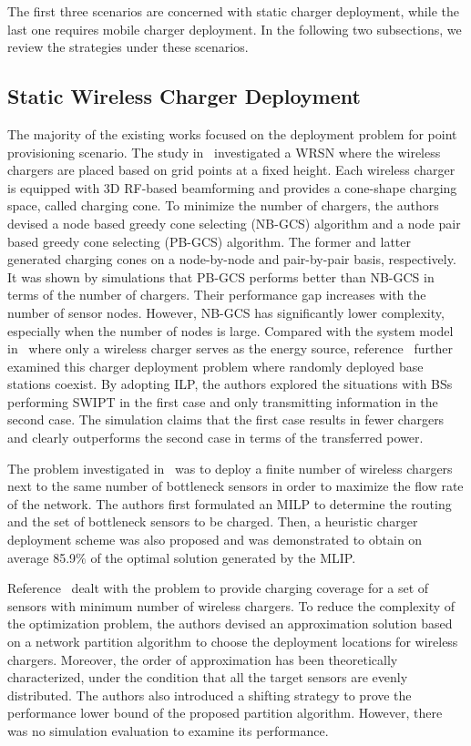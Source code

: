 \documentclass[twocolumn,10pt]{IEEEtran}
\begin{document}
The first three scenarios are concerned with static charger deployment, while the last one requires mobile charger deployment. In the following two subsections, we review the strategies under these scenarios. 
 
 
\subsection{Static Wireless Charger Deployment}


The majority of the existing works \cite{Erol-Kantarci2014,J.2014Liao,Y.2014Pang, T.2015He,H.2014Dai,HDai2014} focused on the deployment problem for point provisioning scenario.
The study in~\cite{J.2014Liao} investigated a WRSN where the wireless chargers are placed based on grid points at a fixed height. Each wireless charger is equipped with 3D RF-based beamforming and provides a cone-shape charging space, called charging cone. To minimize the number of chargers, the authors devised a node based greedy cone selecting (NB-GCS) algorithm and a node pair based greedy cone selecting (PB-GCS) algorithm. The former and latter generated charging cones on a node-by-node and pair-by-pair basis, respectively. It was shown by simulations that PB-GCS performs better than NB-GCS in terms of the number of chargers. Their performance gap increases with the number of sensor nodes. However, NB-GCS has significantly lower complexity, especially when the number of nodes is large. Compared with the system model in~\cite{J.2014Liao} where only a wireless charger serves as the energy source, reference~\cite{Erol-Kantarci2014} further examined this charger deployment problem where randomly deployed base stations coexist.  By adopting ILP, the authors explored the situations with BSs performing SWIPT in the first case and only transmitting information in the second case. The simulation claims that the first case results in fewer chargers and clearly outperforms the second case in terms of the transferred power.

The problem investigated in~\cite{T.2015He} was to deploy a finite number of wireless chargers next to the same number of bottleneck sensors in order to maximize the flow rate of the network. The authors first formulated an MILP to determine the routing and the set of bottleneck sensors to be charged. Then, a heuristic charger deployment scheme was also proposed and was demonstrated to obtain on average 85.9$\%$ of the optimal solution generated by the MLIP.  


Reference~\cite{Y.2014Pang} dealt with the problem to provide charging coverage for a set of sensors with minimum number of wireless chargers. To reduce the complexity of the optimization problem, the authors devised an approximation solution based on a network partition algorithm to choose the deployment locations for wireless chargers. Moreover, the order of approximation has been theoretically characterized, under the condition that all the target sensors are evenly distributed. The authors also introduced a shifting strategy to prove the performance lower bound of the proposed partition algorithm. However, there was no simulation evaluation to examine its performance. 
\end{document}
